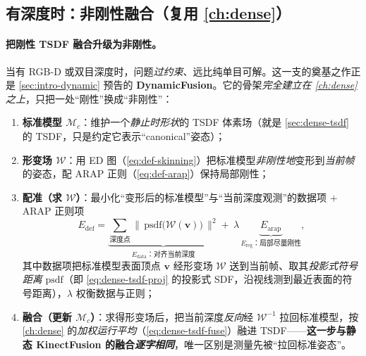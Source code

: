 \subsection{有深度时：非刚性融合（复用 \texorpdfstring{\cref{ch:dense}}{第~5~章}）}
\label{sec:dynamic-rgbd-deform}

\paragraph{把刚性 TSDF 融合升级为非刚性。}
当有 RGB-D 或双目深度时，问题\emph{过约束}、远比纯单目可解\cite{schmid2026dynamic}。这一支的奠基之作正是 \cref{sec:intro-dynamic} 预告的 \textbf{DynamicFusion}\cite{newcombe2015dynamicfusion}。它的骨架\emph{完全建立在 \cref{ch:dense} 之上}，只把一处“刚性”换成“非刚性”：

\begin{enumerate}
  \item \textbf{标准模型 $\mathcal{M}_c$}：维护一个\emph{静止时形状}的 TSDF 体素场（就是 \cref{sec:dense-tsdf} 的 TSDF，只是约定它表示“canonical”姿态）；
  \item \textbf{形变场 $\mathcal{W}$}：用 ED 图（\cref{eq:def-skinning}）把标准模型\emph{非刚性地}变形到\emph{当前帧}的姿态，配 ARAP 正则（\cref{eq:def-arap}）保持局部刚性；
  \item \textbf{配准（求 $\mathcal{W}$）}：最小化“变形后的标准模型”与“当前深度观测”的数据项 $+$ ARAP 正则项
  \begin{equation}
    E_{\mathrm{def}}=\underbrace{\sum_{\text{深度点}}\big\|\,\mathrm{psdf}\big(\mathcal{W}(\mathbf{v})\big)\,\big\|^2}_{E_{\mathrm{data}}：\text{对齐当前深度}}
    +\ \lambda\,\underbrace{E_{\mathrm{arap}}}_{E_{\mathrm{reg}}：\text{局部尽量刚性}},
    \label{eq:def-fusion-energy}
  \end{equation}
  其中数据项把标准模型表面顶点 $\mathbf{v}$ 经形变场 $\mathcal{W}$ 送到当前帧、取其\emph{投影式符号距离} $\mathrm{psdf}$（即 \cref{eq:dense-tsdf-proj} 的投影式 SDF，沿视线测到最近表面的符号距离），$\lambda$ 权衡数据与正则；
  \item \textbf{融合（更新 $\mathcal{M}_c$）}：求得形变场后，把当前深度\emph{反向}经 $\mathcal{W}^{-1}$ 拉回标准模型，按 \cref{ch:dense} 的\emph{加权运行平均}（\cref{eq:dense-tsdf-fuse}）融进 TSDF——\textbf{这一步与静态 KinectFusion 的融合\emph{逐字相同}}，唯一区别是测量先被“拉回标准姿态”。
\end{enumerate}

